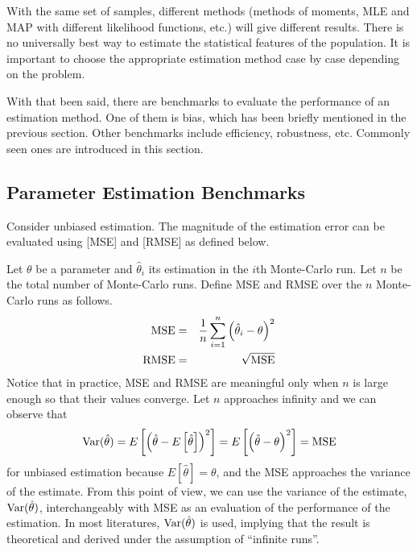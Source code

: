 With the same set of samples, different methods (methods of moments, MLE and MAP with different likelihood functions, etc.) will give different results. There is no universally best way to estimate the statistical features of the population. It is important to choose the appropriate estimation method case by case depending on the problem.

With that been said, there are benchmarks to evaluate the performance of an estimation method. One of them is bias, which has been briefly mentioned in the previous section. Other benchmarks include efficiency, robustness, etc. Commonly seen ones are introduced in this section.

\subsection{Parameter Estimation Benchmarks}

Consider unbiased estimation. The magnitude of the estimation error can be evaluated using [MSE] and [RMSE] as defined below. 

Let $\theta$ be a parameter and $\hat{\theta}_i$ its estimation in the $i$th Monte-Carlo run. Let $n$ be the total number of Monte-Carlo runs. Define MSE and RMSE over the $n$ Monte-Carlo runs as follows.
\begin{eqnarray}
	\textup{MSE} &=& \dfrac{1}{n}\sum_{i=1}^{n}\left(\hat{\theta}_i-\theta\right)^2 \nonumber \\
	\textup{RMSE} &=& \sqrt{\textup{MSE}} \nonumber
\end{eqnarray}
Notice that in practice, MSE and RMSE are meaningful only when $n$ is large enough so that their values converge. Let $n$ approaches infinity and we can observe that
\begin{eqnarray}
	\textup{Var}(\hat{\theta}) = E\left[\left(\hat{\theta}-E\left[\hat{\theta}\right]\right)^2\right] = E\left[\left(\hat{\theta}-\theta\right)^2\right] = \textup{MSE} \nonumber
\end{eqnarray}
for unbiased estimation because $E\left[\hat{\theta}\right]=\theta$, and the MSE approaches the variance of the estimate. From this point of view, we can use the variance of the estimate, $\textup{Var}(\hat{\theta})$, interchangeably with MSE as an evaluation of the performance of the estimation. In most literatures, $\textup{Var}(\hat{\theta})$ is used, implying that the result is theoretical and derived under the assumption of ``infinite runs''.

